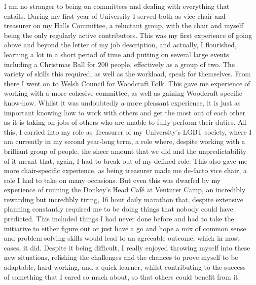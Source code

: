 \documentclass[a4paper, 11pt]{article} %
\begin{document}
\begin{onehalfspacing}
I am no stranger to being on committees and dealing with everything that entails. During my first year of University I served both as vice-chair and treasurer on my Halls Committee, a reluctant group, with the chair and myself being the only regularly active contributors. This was my first experience of going above and beyond the letter of my job description, and actually, I flourished, learning a lot in a short period of time and putting on several large events including a Christmas Ball for 200 people, effectively as a group of two. The variety of skills this required, as well as the workload, speak for themselves. From there I went on to Welsh Council for Woodcraft Folk. This gave me experience of working with a more cohesive committee, as well as gaining Woodcraft specific know-how. Whilst it was undoubtedly a more pleasant experience, it is just as important knowing how to work with others and get the most out of each other as it is taking on jobs of others who are unable to fully perform their duties. All this, I carried into my role as Treasurer of my University's LGBT society, where I am currently in my second year-long term, a role where, despite working with a brilliant group of people, the sheer amount that we did and the unpredictability of it meant that, again, I had to break out of my defined role. This also gave me more chair-specific experience, as being treasurer made me de-facto vice chair, a role I had to take on many occasions. But even this was dwarfed by my experience of running the Donkey's Head Café at Venturer Camp, an incredibly rewarding but incredibly tiring, 16 hour daily marathon that, despite extensive planning constantly required me to be doing things that nobody could have predicted. This included things I had never done before and had to take the initiative to either figure out or just have a go and hope a mix of common sense and problem solving skills would lead to an agreeable outcome, which in most cases, it did. Despite it being difficult, I really enjoyed throwing myself into these new situations, relishing the challenges and the chances to prove myself to be adaptable, hard working, and a quick learner, whilst contributing to the success of something that I cared so much about, so that others could benefit from it.

\end{onehalfspacing}
\end{document}
